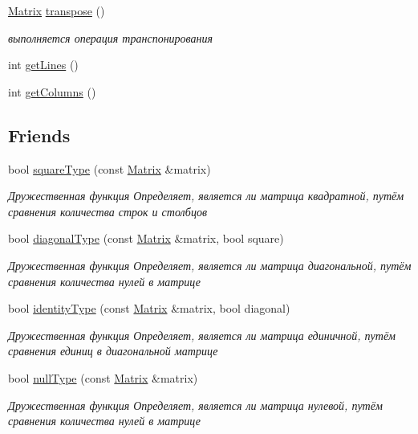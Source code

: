 \begin{DoxyCompactItemize}
\hyperlink{class_matrix}{Matrix} \hyperlink{class_matrix_ae23f817021383e3c8636a714dcba1d21}{transpose} ()
\begin{DoxyCompactList}\small\item\em выполняется операция транспонирования \end{DoxyCompactList}\item 
int \hyperlink{class_matrix_acc315708bcdb54795a686b91277f5bdf}{get\-Lines} ()
\item 
int \hyperlink{class_matrix_a324b4057cd6e2167687e406abd720020}{get\-Columns} ()
\end{DoxyCompactItemize}
\subsection*{Friends}
\begin{DoxyCompactItemize}
\item 
bool \hyperlink{class_matrix_ac308d2d0cd1651df117cd293f4a062ec}{square\-Type} (const \hyperlink{class_matrix}{Matrix} \&matrix)
\begin{DoxyCompactList}\small\item\em Дружественная функция Определяет, является ли матрица квадратной, путём сравнения количества строк и столбцов \end{DoxyCompactList}\item 
bool \hyperlink{class_matrix_a8f168d2d101b11060ff7665b718dbd00}{diagonal\-Type} (const \hyperlink{class_matrix}{Matrix} \&matrix, bool square)
\begin{DoxyCompactList}\small\item\em Дружественная функция Определяет, является ли матрица диагональной, путём сравнения количества нулей в матрице \end{DoxyCompactList}\item 
bool \hyperlink{class_matrix_a53225b6314572edc7c8d855d359c9395}{identity\-Type} (const \hyperlink{class_matrix}{Matrix} \&matrix, bool diagonal)
\begin{DoxyCompactList}\small\item\em Дружественная функция Определяет, является ли матрица единичной, путём сравнения единиц в диагональной матрице \end{DoxyCompactList}\item 
bool \hyperlink{class_matrix_ad324d8057612009e306716ff6f944d8d}{null\-Type} (const \hyperlink{class_matrix}{Matrix} \&matrix)
\begin{DoxyCompactList}\small\item\em Дружественная функция Определяет, является ли матрица нулевой, путём сравнения количества нулей в матрице \end{DoxyCompactList}\item 

\end{DoxyCompactItemize}
